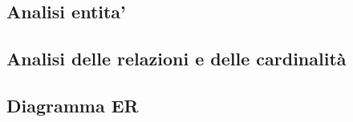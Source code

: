 \subsection{Analisi entita'}\label{analisi_entita}
    
    
\subsection{Analisi delle relazioni e delle cardinalità}
    

\subsection{Diagramma ER}
    